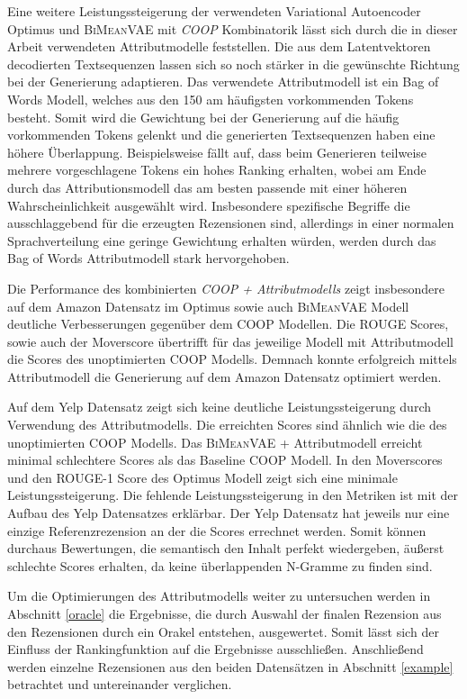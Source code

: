 Eine weitere Leistungssteigerung der verwendeten Variational Autoencoder Optimus und \textsc{BiMeanVAE} mit \textit{COOP} Kombinatorik lässt sich durch die in dieser Arbeit verwendeten Attributmodelle feststellen.
Die aus dem Latentvektoren decodierten Textsequenzen lassen sich so noch stärker in die gewünschte Richtung bei der Generierung adaptieren. 
Das verwendete Attributmodell ist ein Bag of Words Modell, welches aus den 150 am häufigsten vorkommenden Tokens besteht. 
Somit wird die Gewichtung bei der Generierung auf die häufig vorkommenden Tokens gelenkt und die generierten Textsequenzen haben eine höhere Überlappung.
Beispielsweise fällt auf, dass beim Generieren teilweise mehrere vorgeschlagene Tokens ein hohes Ranking erhalten, wobei am Ende durch das Attributionsmodell das am besten passende mit einer höheren Wahrscheinlichkeit ausgewählt wird.
Insbesondere spezifische Begriffe die ausschlaggebend für die erzeugten Rezensionen sind, allerdings in einer normalen Sprachverteilung eine geringe Gewichtung erhalten würden, werden durch das Bag of Words Attributmodell stark hervorgehoben.

Die Performance des kombinierten \textit{COOP + Attributmodells} zeigt insbesondere auf dem Amazon Datensatz im Optimus sowie auch \textsc{BiMeanVAE} Modell deutliche Verbesserungen gegenüber dem COOP Modellen.
Die ROUGE Scores, sowie auch der Moverscore übertrifft für das jeweilige Modell mit Attributmodell die Scores des unoptimierten COOP Modells. 
Demnach konnte erfolgreich mittels Attributmodell die Generierung auf dem Amazon Datensatz optimiert werden.

Auf dem Yelp Datensatz zeigt sich keine deutliche Leistungssteigerung durch Verwendung des Attributmodells. 
Die erreichten Scores sind ähnlich wie die des unoptimierten COOP Modells. 
Das \textsc{BiMeanVAE} + Attributmodell erreicht minimal schlechtere Scores als das Baseline COOP Modell.
In den Moverscores und den ROUGE-1 Score des Optimus Modell zeigt sich eine minimale Leistungssteigerung.
Die fehlende Leistungssteigerung in den Metriken ist mit der Aufbau des Yelp Datensatzes erklärbar. 
Der Yelp Datensatz hat jeweils nur eine einzige Referenzrezension an der die Scores errechnet werden.
Somit können durchaus Bewertungen, die semantisch den Inhalt perfekt wiedergeben, äußerst schlechte Scores erhalten, da keine überlappenden N-Gramme zu finden sind.

Um die Optimierungen des Attributmodells weiter zu untersuchen werden in Abschnitt \ref{oracle} die Ergebnisse, die durch Auswahl der finalen Rezension aus den Rezensionen durch ein Orakel entstehen, ausgewertet.
Somit lässt sich der Einfluss der Rankingfunktion auf die Ergebnisse ausschließen.
Anschließend werden einzelne Rezensionen aus den beiden Datensätzen in Abschnitt \ref{example} betrachtet und untereinander verglichen.



